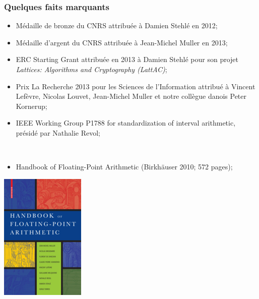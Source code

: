 \documentclass[mathsans]{beamer}
\begin{document}
\begin{frame}
\frametitle{Quelques faits marquants}
\begin{itemize}
\item \alert{Médaille de bronze du CNRS} attribuée à Damien Stehlé en 2012;
\item \alert{Médaille d'argent du CNRS} attribuée à Jean-Michel Muller en 2013;
\item \alert{ERC Starting Grant} attribuée en 2013 à Damien Stehlé pour son projet \emph{Lattices: Algorithms and Cryptography (LattAC)};
\item \alert{Prix La Recherche 2013} pour les Sciences de l'Information attribué à Vincent Lefèvre, Nicolas Louvet,  Jean-Michel Muller et notre collègue danois Peter Kornerup;
\item \alert{IEEE Working Group P1788 for standardization of interval arithmetic,} présidé par Nathalie Revol;%
\end{itemize}~\\[-1cm]
\begin{minipage}{9.5cm}
\begin{itemize}
\item \alert{Handbook of Floating-Point Arithmetic} (Birkhäuser 2010; 572 pages);
\end{itemize}
\end{minipage}
\begin{minipage}{2cm}
\includegraphics[scale=1.2]{Figures/handbook-fpa.jpg}
\end{minipage}

\end{frame}


%
\end{document}
